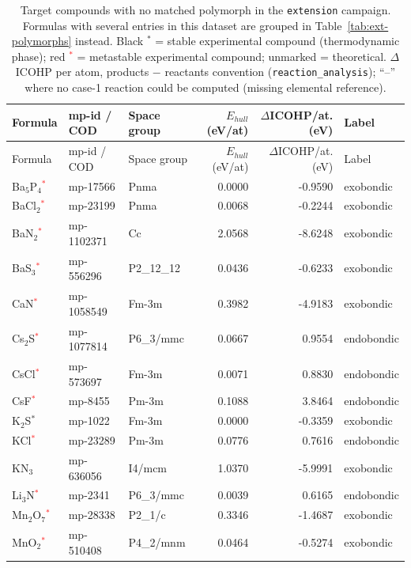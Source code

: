 \begin{longtable}{@{}lllrrl@{}}
\caption{Target compounds with no matched polymorph in the \texttt{extension} campaign. Formulas with several entries in this dataset are grouped in Table~\ref{tab:ext-polymorphs} instead. Black $^*$ = stable experimental compound (thermodynamic phase); red \textcolor{red}{$^*$} = metastable experimental compound; unmarked = theoretical. $\Delta$ICOHP per atom, products $-$ reactants convention (\texttt{reaction\_analysis}); ``--'' where no case-1 reaction could be computed (missing elemental reference).}\\
\toprule
Formula & mp-id / COD & Space group & $E_{hull}$ (eV/at) & $\Delta$ICOHP/at. (eV) & Label \\
\midrule
\endfirsthead
\toprule
Formula & mp-id / COD & Space group & $E_{hull}$ (eV/at) & $\Delta$ICOHP/at. (eV) & Label \\
\midrule
\endhead
\bottomrule
\endfoot
Ba$_{5}$P$_{4}$\textcolor{red}{$^*$} & mp-17566 & Pnma & 0.0000 & -0.9590 & exobondic \\
BaCl$_{2}$\textcolor{red}{$^*$} & mp-23199 & Pnma & 0.0068 & -0.2244 & exobondic \\
BaN$_{2}$\textcolor{red}{$^*$} & mp-1102371 & Cc & 2.0568 & -8.6248 & exobondic \\
BaS$_{3}$\textcolor{red}{$^*$} & mp-556296 & P2\_12\_12 & 0.0436 & -0.6233 & exobondic \\
CaN\textcolor{red}{$^*$} & mp-1058549 & Fm-3m & 0.3982 & -4.9183 & exobondic \\
Cs$_{2}$S\textcolor{red}{$^*$} & mp-1077814 & P6\_3/mmc & 0.0667 & 0.9554 & endobondic \\
CsCl\textcolor{red}{$^*$} & mp-573697 & Fm-3m & 0.0071 & 0.8830 & endobondic \\
CsF\textcolor{red}{$^*$} & mp-8455 & Pm-3m & 0.1088 & 3.8464 & endobondic \\
K$_{2}$S$^*$ & mp-1022 & Fm-3m & 0.0000 & -0.3359 & exobondic \\
KCl\textcolor{red}{$^*$} & mp-23289 & Pm-3m & 0.0776 & 0.7616 & endobondic \\
KN$_{3}$ & mp-636056 & I4/mcm & 1.0370 & -5.9991 & exobondic \\
Li$_{3}$N\textcolor{red}{$^*$} & mp-2341 & P6\_3/mmc & 0.0039 & 0.6165 & endobondic \\
Mn$_{2}$O$_{7}$\textcolor{red}{$^*$} & mp-28338 & P2\_1/c & 0.3346 & -1.4687 & exobondic \\
MnO$_{2}$\textcolor{red}{$^*$} & mp-510408 & P4\_2/mnm & 0.0464 & -0.5274 & exobondic \\

\end{longtable}
